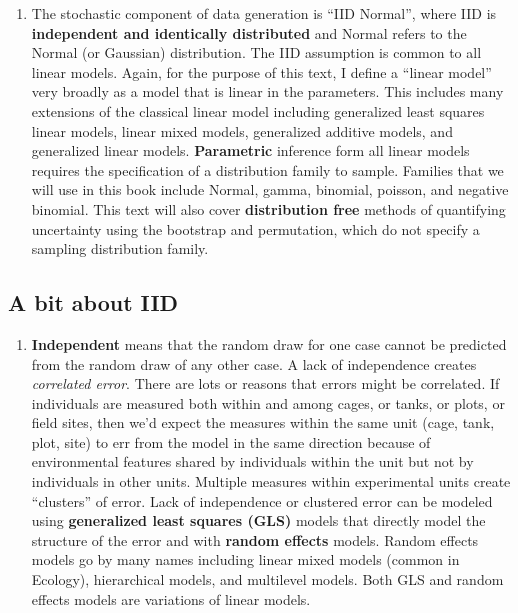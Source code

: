 \documentclass[]{book}
\providecommand{\tightlist}{%
  \setlength{\itemsep}{0pt}\setlength{\parskip}{0pt}}
\begin{document}
\begin{enumerate}
\def\labelenumi{\arabic{enumi}.}
\setcounter{enumi}{1}
\tightlist
\item
  The stochastic component of data generation is ``IID Normal'', where IID is \textbf{independent and identically distributed} and Normal refers to the Normal (or Gaussian) distribution. The IID assumption is common to all linear models. Again, for the purpose of this text, I define a ``linear model'' very broadly as a model that is linear in the parameters. This includes many extensions of the classical linear model including generalized least squares linear models, linear mixed models, generalized additive models, and generalized linear models. \textbf{Parametric} inference form all linear models requires the specification of a distribution family to sample. Families that we will use in this book include Normal, gamma, binomial, poisson, and negative binomial. This text will also cover \textbf{distribution free} methods of quantifying uncertainty using the bootstrap and permutation, which do not specify a sampling distribution family.
\end{enumerate}

\hypertarget{a-bit-about-iid}{%
\subsection{A bit about IID}\label{a-bit-about-iid}}

\begin{enumerate}
\def\labelenumi{\arabic{enumi}.}
\tightlist
\item
  \textbf{Independent} means that the random draw for one case cannot be predicted from the random draw of any other case. A lack of independence creates \emph{correlated error}. There are lots or reasons that errors might be correlated. If individuals are measured both within and among cages, or tanks, or plots, or field sites, then we'd expect the measures within the same unit (cage, tank, plot, site) to err from the model in the same direction because of environmental features shared by individuals within the unit but not by individuals in other units. Multiple measures within experimental units create ``clusters'' of error. Lack of independence or clustered error can be modeled using \textbf{generalized least squares (GLS)} models that directly model the structure of the error and with \textbf{random effects} models. Random effects models go by many names including linear mixed models (common in Ecology), hierarchical models, and multilevel models. Both GLS and random effects models are variations of linear models.
\end{enumerate}
\end{document}
